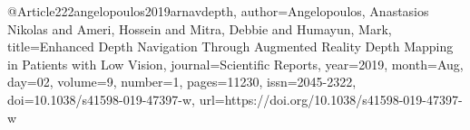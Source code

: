 @Article{222angelopoulos2019arnavdepth,
author={Angelopoulos, Anastasios Nikolas
and Ameri, Hossein
and Mitra, Debbie
and Humayun, Mark},
title={Enhanced Depth Navigation Through Augmented Reality Depth Mapping in Patients with Low Vision},
journal={Scientific Reports},
year={2019},
month={Aug},
day={02},
volume={9},
number={1},
pages={11230},
issn={2045-2322},
doi={10.1038/s41598-019-47397-w},
url={https://doi.org/10.1038/s41598-019-47397-w}
}